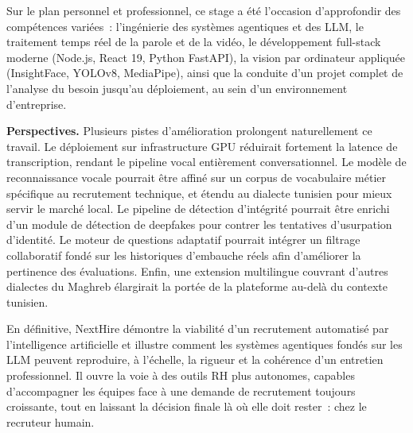 Sur le plan personnel et professionnel, ce stage a été l'occasion d'approfondir des
compétences variées~: l'ingénierie des systèmes agentiques et des LLM, le traitement temps
réel de la parole et de la vidéo, le développement full-stack moderne (Node.js, React 19,
Python FastAPI), la vision par ordinateur appliquée (InsightFace, YOLOv8, MediaPipe),
ainsi que la conduite d'un projet complet de l'analyse du besoin jusqu'au déploiement,
au sein d'un environnement d'entreprise.

\noindent\textbf{Perspectives.}
Plusieurs pistes d'amélioration prolongent naturellement ce travail. Le déploiement sur
infrastructure GPU réduirait fortement la latence de transcription, rendant
le pipeline vocal entièrement conversationnel. Le modèle de reconnaissance vocale pourrait
être affiné sur un corpus de vocabulaire métier spécifique au recrutement technique, et
étendu au dialecte tunisien pour mieux servir le marché local. Le pipeline de détection
d'intégrité pourrait être enrichi d'un module de détection de deepfakes pour contrer les
tentatives d'usurpation d'identité. Le moteur de questions adaptatif pourrait intégrer
un filtrage collaboratif fondé sur les historiques d'embauche réels afin d'améliorer la
pertinence des évaluations. Enfin, une extension multilingue couvrant d'autres dialectes
du Maghreb élargirait la portée de la plateforme au-delà du contexte tunisien.

\enlargethispage{2\baselineskip}%
\noindent En définitive, NextHire démontre la viabilité d'un recrutement automatisé par l'intelligence
artificielle et illustre comment les systèmes agentiques fondés sur les LLM peuvent
reproduire, à l'échelle, la rigueur et la cohérence d'un entretien professionnel. Il ouvre
la voie à des outils RH plus autonomes, capables d'accompagner les équipes face à une
demande de recrutement toujours croissante, tout en laissant la décision finale là où elle
doit rester~: chez le recruteur humain.
